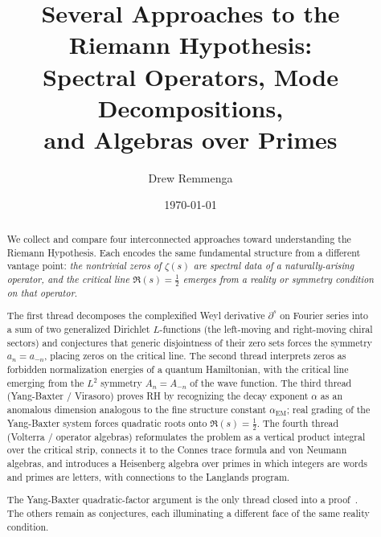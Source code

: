 \documentclass[%
 aip,
 amsmath,amssymb,
 reprint,%
]{revtex4-1}
\theoremstyle{plain}
\theoremstyle{definition}
\begin{document}

\title{Several Approaches to the Riemann Hypothesis:\\
Spectral Operators, Mode Decompositions,\\
and Algebras over Primes}

\author{Drew Remmenga}
%

\date{\today}

\begin{abstract}
We collect and compare four interconnected approaches toward understanding the
Riemann Hypothesis.  Each encodes the same fundamental structure from a different
vantage point: \emph{the nontrivial zeros of $\zeta(s)$ are spectral data of a
naturally-arising operator, and the critical line $\Re(s)=\tfrac12$ emerges from
a reality or symmetry condition on that operator}.

The first thread decomposes the complexified Weyl derivative $\partial^s$ on
Fourier series into a sum of two generalized Dirichlet $L$-functions (the
left-moving and right-moving chiral sectors) and conjectures that generic
disjointness of their zero sets forces the symmetry $a_n = a_{-n}$, placing
zeros on the critical line.  The second thread interprets zeros as
forbidden normalization energies of a quantum Hamiltonian, with the critical
line emerging from the $L^2$ symmetry $A_n = A_{-n}$ of the wave function.
The third thread (Yang-Baxter / Virasoro) proves RH by recognizing the decay
exponent $\alpha$ as an anomalous dimension analogous to the fine
structure constant $\alpha_{\mathrm{EM}}$; real grading of the Yang-Baxter
system forces quadratic roots onto $\Re(s) = \tfrac12$.  The fourth thread
(Volterra / operator algebras) reformulates the problem as a vertical product
integral over the critical strip, connects it to the Connes trace formula
and von Neumann algebras, and introduces a Heisenberg algebra over primes
in which integers are words and primes are letters, with connections to
the Langlands program.

The Yang-Baxter quadratic-factor argument is the only thread closed into a
proof~\cite{companion}.  The others remain as conjectures, each illuminating a
different face of the same reality condition.
\end{abstract}

\maketitle
\end{document}
